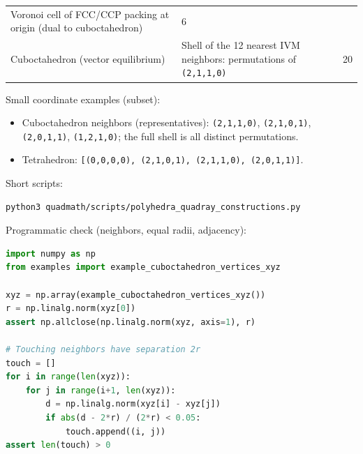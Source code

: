 \documentclass[
  10pt,
]{article}
\newcommand{\passthrough}[1]{#1}
\providecommand{\tightlist}{%
  \setlength{\itemsep}{0pt}\setlength{\parskip}{0pt}}
\begin{document}
\begin{longtable}[]{@{}lll@{}}
\begin{minipage}[t]{0.30\columnwidth}
Voronoi cell of FCC/CCP packing at origin (dual to cuboctahedron)\strut
\end{minipage} & \begin{minipage}[t]{0.30\columnwidth}\raggedright
6\strut
\end{minipage}\tabularnewline
\begin{minipage}[t]{0.30\columnwidth}\raggedright
Cuboctahedron (vector equilibrium)\strut
\end{minipage} & \begin{minipage}[t]{0.30\columnwidth}\raggedright
Shell of the 12 nearest IVM neighbors: permutations of
\passthrough{\lstinline!(2,1,1,0)!}\strut
\end{minipage} & \begin{minipage}[t]{0.30\columnwidth}\raggedright
20\strut
\end{minipage}\tabularnewline
\bottomrule
\end{longtable}

Small coordinate examples (subset):

\begin{itemize}
\tightlist
\item
  Cuboctahedron neighbors (representatives):
  \passthrough{\lstinline!(2,1,1,0)!},
  \passthrough{\lstinline!(2,1,0,1)!},
  \passthrough{\lstinline!(2,0,1,1)!},
  \passthrough{\lstinline!(1,2,1,0)!}; the full shell is all distinct
  permutations.
\item
  Tetrahedron:
  \passthrough{\lstinline![(0,0,0,0), (2,1,0,1), (2,1,1,0), (2,0,1,1)]!}.
\end{itemize}

Short scripts:

\begin{lstlisting}[language=bash]
python3 quadmath/scripts/polyhedra_quadray_constructions.py
\end{lstlisting}

Programmatic check (neighbors, equal radii, adjacency):

\begin{lstlisting}[language=Python]
import numpy as np
from examples import example_cuboctahedron_vertices_xyz

xyz = np.array(example_cuboctahedron_vertices_xyz())
r = np.linalg.norm(xyz[0])
assert np.allclose(np.linalg.norm(xyz, axis=1), r)

# Touching neighbors have separation 2r
touch = []
for i in range(len(xyz)):
    for j in range(i+1, len(xyz)):
        d = np.linalg.norm(xyz[i] - xyz[j])
        if abs(d - 2*r) / (2*r) < 0.05:
            touch.append((i, j))
assert len(touch) > 0
\end{lstlisting}
\end{document}
